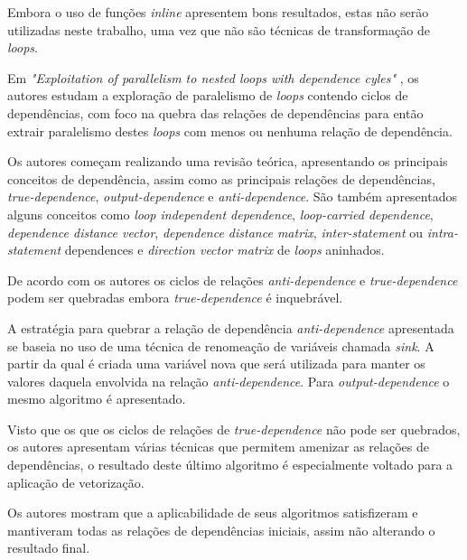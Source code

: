 Embora o uso de funções \textit{inline} apresentem bons resultados, estas não
serão utilizadas neste trabalho, uma vez que não são técnicas de transformação
de \textit{loops}.


Em \textit{"Exploitation of parallelism to nested loops with dependence
cyles"} \cite{Chang:2004}, os autores estudam a exploração de paralelismo de
\textit{loops} contendo ciclos de dependências, com foco na quebra das relações 
de dependências para então extrair paralelismo destes \textit{loops} com menos
ou nenhuma relação de dependência.

Os autores começam realizando uma revisão teórica, apresentando os principais
conceitos de dependência, assim como as principais relações de dependências, 
\textit{true-dependence}, \textit{output-dependence} e \textit{anti-dependence}.  
São também apresentados alguns conceitos como \textit{loop independent dependence}, 
\textit{loop-carried dependence}, \textit{dependence distance vector}, 
\textit{dependence distance matrix}, \textit{inter-statement} ou
\textit{intra-statement} dependences e \textit{direction vector matrix} de
\textit{loops} aninhados.

De acordo com os autores os ciclos de relações \textit{anti-dependence} e
\textit{true-dependence} podem ser quebradas embora \textit{true-dependence} é 
inquebrável.

A estratégia para quebrar a relação de dependência \textit{anti-dependence}
apresentada se baseia no uso de uma técnica de renomeação de variáveis
chamada \textit{sink}. 
A partir da qual é criada uma variável nova que será utilizada para manter os
valores daquela envolvida na relação \textit{anti-dependence}.  
Para \textit{output-dependence} o mesmo algoritmo é apresentado.

Visto que os que os ciclos de relações de \textit{true-dependence} não pode ser
quebrados, os autores apresentam várias técnicas que permitem amenizar as
relações de dependências, o resultado deste último algoritmo é especialmente
voltado para a aplicação de vetorização.

Os autores mostram que a aplicabilidade de seus algoritmos satisfizeram e
mantiveram todas as relações de dependências iniciais, assim não alterando o 
resultado final.

